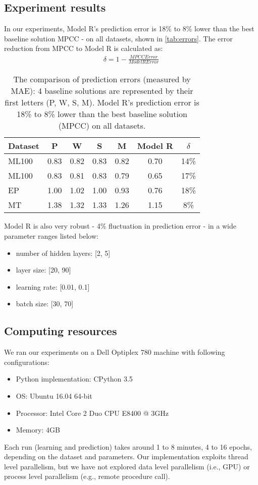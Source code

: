 \documentclass[letterpaper]{article}
\begin{document}
\subsection{Experiment results}
In our experiments, Model R's prediction error is 18\% to 8\% lower than
the best baseline solution MPCC - on all datasets, shown in 
\autoref{tab:errors}.
The error reduction from MPCC to Model R is calculated as:
\begin{align*}
	\delta = 1 - \frac{MPCCError}{ModelRError}
\end{align*}
\begin{table}[h]
	\centering
	\caption{The comparison of prediction errors (measured by MAE): 4 baseline
		solutions are represented by their first letters (P, W, S, M).
		Model R's prediction error is 18\% to 8\% lower than the best baseline 
		solution (MPCC) on all datasets.
		}
	\begin{tabularx}{0.5\textwidth}{ |X|c|c|c|c|c|c| } \hline \rowcolor{blue!50}
		Dataset & P & W & S & M & Model R & $ \delta $ \\ \hline
		ML100   & 0.83 & 0.82 & 0.83 & 0.82 & 0.70 & 14\% \\ \hline
		ML100   & 0.83 & 0.81 & 0.83 & 0.79 & 0.65 & 17\% \\ \hline
		EP      & 1.00 & 1.02 & 1.00 & 0.93 & 0.76 & 18\% \\ \hline
		MT      & 1.38 & 1.32 & 1.33 & 1.26 & 1.15 & 8\% \\ \hline
	\end{tabularx}
	\label{tab:errors}
\end{table}
Model R is also very robust - 4\% fluctuation in prediction error - in a wide 
parameter ranges listed below:
\begin{itemize}
	\item number of hidden layers: [2, 5]
	\item layer size: [20, 90]
	\item learning rate: [0.01, 0.1]
	\item batch size: [30, 70]
\end{itemize}

\subsection{Computing resources}
We ran our experiments on a Dell Optiplex 780 machine with following 
configurations:
\begin{itemize}
	\item Python implementation: CPython 3.5
	\item OS: Ubuntu 16.04 64-bit
	\item Processor: Intel Core 2 Duo CPU E8400 @ 3GHz
	\item Memory: 4GB
\end{itemize}
Each run (learning and prediction) takes around 1 to 8 minutes, 4 to 16 epochs, 
depending on the dataset and parameters.
Our implementation exploits thread level parallelism, but we have not explored 
data level parallelism (i.e., GPU) or process level parallelism (e.g., remote 
procedure call).
\end{document}

